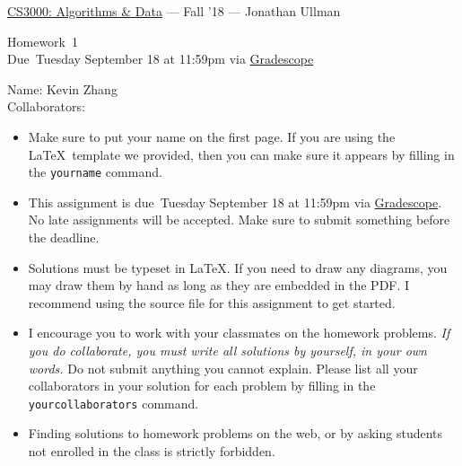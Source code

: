 \documentclass[11pt]{article}
\newcommand{\yourname}{Kevin Zhang}
\newcommand{\yourcollaborators}{}
\theoremstyle{definition}
\newcommand{\instructor}{Jonathan Ullman}
\newcommand{\hwnum}{1}
\newcommand{\hwdue}{Tuesday September 18 at 11:59pm via \href{https://gradescope.com/courses/13812}{Gradescope}}
\theoremstyle{theorem}
\begin{document}
{\Large 
\begin{center}\href{http://www.ccs.neu.edu/home/jullman/cs3000f18/syllabus.html}{CS3000: Algorithms \& Data} --- Fall '18 --- \instructor \end{center}}
{\large
\vspace{10pt}
\noindent Homework~\hwnum \vspace{2pt}\\
Due~\hwdue}

\bigskip
{\large
\noindent Name: \yourname \vspace{2pt}\\ Collaborators: \yourcollaborators}

\vspace{15pt}
\begin{itemize}

\item Make sure to put your name on the first page.  If you are using the \LaTeX~template we provided, then you can make sure it appears by filling in the \texttt{yourname} command.

\item This assignment is due~\hwdue.  No late assignments will be accepted.  Make sure to submit something before the deadline.

\item Solutions must be typeset in \LaTeX.  If you need to draw any diagrams, you may draw them by hand as long as they are embedded in the PDF.  I recommend using the source file for this assignment to get started.

\item I encourage you to work with your classmates on the homework problems. \emph{If you do collaborate, you must write all solutions by yourself, in your own words.}  Do not submit anything you cannot explain.  Please list all your collaborators in your solution for each problem by filling in the \texttt{yourcollaborators} command.

\item Finding solutions to homework problems on the web, or by asking students not enrolled in the class is strictly forbidden.

\end{itemize}

\newpage
\end{document}
